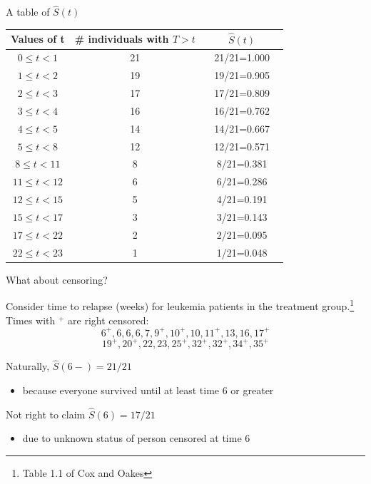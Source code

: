 \documentclass[ignorenonframetext,]{beamer}
\providecommand{\tightlist}{%
  \setlength{\itemsep}{0pt}\setlength{\parskip}{0pt}}
\begin{document}
\begin{frame}{%
\protect\hypertarget{a-table-of-widehatst}{%
A table of \(\widehat{S}(t)\)}}

\begin{center}
\begin{tabular}{c|c|c}
Values of t & \# individuals with $T > t$ & ~~~~$\widehat{S}(t)$~~~~ \\
\hline
$0 \leq t < 1 $  & 21 & 21/21=1.000 \\
$1 \leq t < 2 $  & 19 & 19/21=0.905\\
$2 \leq t < 3 $  & 17 & 17/21=0.809\\
$3 \leq t < 4 $  & 16 & 16/21=0.762\\
$4 \leq t < 5 $  & 14 & 14/21=0.667\\
$5 \leq t < 8 $  & 12 & 12/21=0.571\\
$8 \leq t < 11 $ & 8 & 8/21=0.381\\ 
$11 \leq t < 12 $ & 6 & 6/21=0.286\\
$12 \leq t < 15 $ & 5 & 4/21=0.191\\
$15 \leq t < 17 $ & 3 & 3/21=0.143\\
$17 \leq t < 22 $ & 2 & 2/21=0.095\\
$22 \leq t < 23 $ & 1 & 1/21=0.048\\
\end{tabular}
\end{center}

\end{frame}

\begin{frame}{%
\protect\hypertarget{what-about-censoring}{%
What about censoring?}}

Consider time to relapse (weeks) for leukemia patients in the treatment
group.\footnote{Table 1.1 of Cox and Oakes} Times with \(^+\) are right
censored: \[6^+,6,6,6,7,9^+,10^+,10,11^+,13,16,17^+\]
\[19^+,20^+,22,23,25^+,32^+,32^+,34^+,35^+\]

Naturally, \(\widehat{S}(6-)= 21/21\)

\begin{itemize}
\tightlist
\item
  because everyone survived until at least time 6 or greater
\end{itemize}

Not right to claim \(\widehat{S}(6) = 17/21\)

\begin{itemize}
\tightlist
\item
  due to unknown status of person censored at time 6
\end{itemize}

\end{frame}
\end{document}

